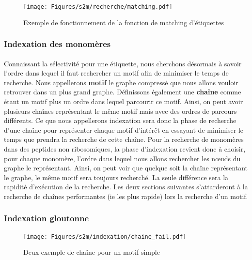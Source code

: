 \documentclass[12pt,french,twoside]{report}
\begin{document}
\begin{figure}
  \texttt{[image: Figures/s2m/recherche/matching.pdf]}
  \caption{\label{label_matching}Exemple de fonctionnement de la fonction de matching d'étiquettes}
\end{figure}

\subsubsection{Indexation des monomères}

\label{index_p}

\paragraph{}Connaissant la sélectivité pour une étiquette, nous cherchons désormais à savoir l'ordre dans lequel il faut rechercher
un motif afin de minimiser le temps de recherche.
Nous appellerons \textbf{motif} le graphe compressé que nous allons vouloir retrouver dans un plus
grand graphe. Définissons également une \textbf{chaîne} comme étant un motif plus un ordre dans lequel parcourir ce motif. Ainsi,
on peut avoir plusieurs chaînes représentant le même motif mais avec des ordres de parcours différents. Ce que nous appellerons
indexation sera donc la phase de recherche d'une chaîne pour représenter chaque motif d'intérêt en essayant de minimiser le temps
que prendra la recherche de cette chaîne. Pour la recherche de monomères dans
des peptides non ribosomiques, la phase d'indexation revient donc à choisir, pour chaque monomère, l'ordre dans lequel nous allons
rechercher les n\oe{}uds du graphe le représentant. Ainsi, on peut voir que quelque soit la chaîne représentant le graphe, le même
motif sera toujours recherché. La seule différence sera la rapidité d'exécution de la recherche. Les deux sections suivantes
s'attarderont à la recherche de chaînes performantes (ie les plus rapide) lors la recherche d'un motif.


\subsubsection{Indexation gloutonne}

\begin{figure}
  \texttt{[image: Figures/s2m/indexation/chaine\_fail.pdf]}
  \caption{\label{chaine_fail}Deux exemple de chaîne pour un motif simple}
\end{figure}
\end{document}
